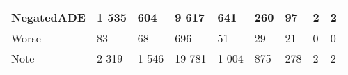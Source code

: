 \begin{tabular}{|l|l|l|p{}|p{}|l|l|l|l|}
\hline
NegatedADE                                                                         & 1 535  & 604    & 9 617                            & 641              & 260   & 97                   & 2     & 2                       \\ 
\hline
Worse                                                                              & 83     & 68     & 696                            & 51               & 29    & 21                   & 0     & 0                       \\ 
\hline
Note                                                                               & 2 319  & 1 546   & 19 781                           & 1 004             & 875   & 278                  & 2     & 2                       \\
\hline
\end{tabular}

